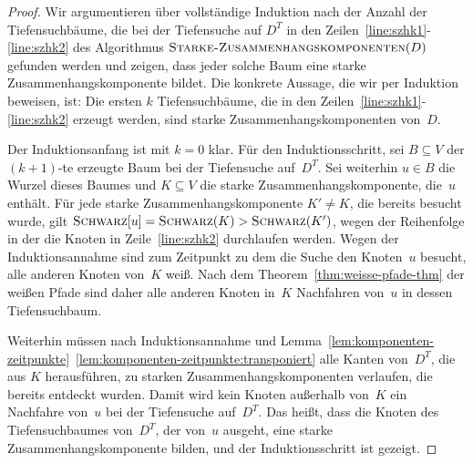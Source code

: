 \begin{proof}
Wir argumentieren über vollständige Induktion nach der Anzahl der Tiefensuchbäume, die bei der Tiefensuche auf $D^T$ in den Zeilen~\ref{line:szhk1}-\ref{line:szhk2} des Algorithmus $\mathop{\text{\textsc{Starke-Zusammenhangskomponenten}}}(D)$ gefunden werden und zeigen, dass jeder solche Baum eine starke Zusammenhangskomponente bildet.
Die konkrete Aussage, die wir per Induktion beweisen, ist: \glqq Die ersten $k$ Tiefensuchbäume, die in den Zeilen~\ref{line:szhk1}-\ref{line:szhk2} erzeugt werden, sind starke Zusammenhangskomponenten von~$D$.\grqq

Der Induktionsanfang ist mit $k=0$ klar.
Für den Induktionsschritt, sei $B \subseteq V$ der $(k+1)$-te erzeugte Baum bei der Tiefensuche auf~$D^T$.
Sei weiterhin $u \in B$ die Wurzel dieses Baumes und $K \subseteq V$ die starke Zusammenhangskomponente, die~$u$ enthält.
Für jede starke Zusammenhangskomponente $K' \neq K$, die bereits besucht wurde, gilt $\mathop{\text{\textsc{Schwarz}}}[u] = \mathop{\text{\textsc{Schwarz}}}(K) > \mathop{\text{\textsc{Schwarz}}}(K')$, wegen der Reihenfolge in der die Knoten in Zeile~\ref{line:szhk2} durchlaufen werden.
Wegen der Induktionsannahme sind zum Zeitpunkt zu dem die Suche den Knoten~$u$ besucht, alle anderen Knoten von~$K$ weiß.
Nach dem Theorem~\ref{thm:weisse-pfade-thm} der weißen Pfade sind daher alle anderen Knoten in~$K$ Nachfahren von~$u$ in dessen Tiefensuchbaum.

Weiterhin müssen nach Induktionsannahme und Lemma~\ref{lem:komponenten-zeitpunkte}~\ref{lem:komponenten-zeitpunkte:transponiert} alle Kanten von~$D^T$, die aus $K$ herausführen, zu starken Zusammenhangskomponenten verlaufen, die bereits entdeckt wurden.
Damit wird kein Knoten außerhalb von~$K$ ein Nachfahre von~$u$ bei der Tiefensuche auf~$D^T$.
Das heißt, dass die Knoten des Tiefensuchbaumes von~$D^T$, der von~$u$ ausgeht, eine starke Zusammenhangskomponente bilden, und der Induktionsschritt ist gezeigt.
\end{proof}
